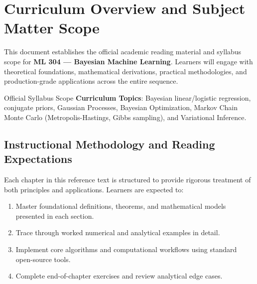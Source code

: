 \section{Curriculum Overview and Subject Matter Scope}

This document establishes the official academic reading material and syllabus scope for \textbf{ML 304 --- Bayesian Machine Learning}. Learners will engage with theoretical foundations, mathematical derivations, practical methodologies, and production-grade applications across the entire sequence.

\begin{InsightBox}{Official Syllabus Scope}
  \textbf{Curriculum Topics}: Bayesian linear/logistic regression, conjugate priors, Gaussian Processes, Bayesian Optimization, Markov Chain Monte Carlo (Metropolis-Hastings, Gibbs sampling), and Variational Inference.
\end{InsightBox}

\subsection{Instructional Methodology and Reading Expectations}

Each chapter in this reference text is structured to provide rigorous treatment of both principles and applications. Learners are expected to:
\begin{enumerate}
  \item Master foundational definitions, theorems, and mathematical models presented in each section.
  \item Trace through worked numerical and analytical examples in detail.
  \item Implement core algorithms and computational workflows using standard open-source tools.
  \item Complete end-of-chapter exercises and review analytical edge cases.
\end{enumerate}

